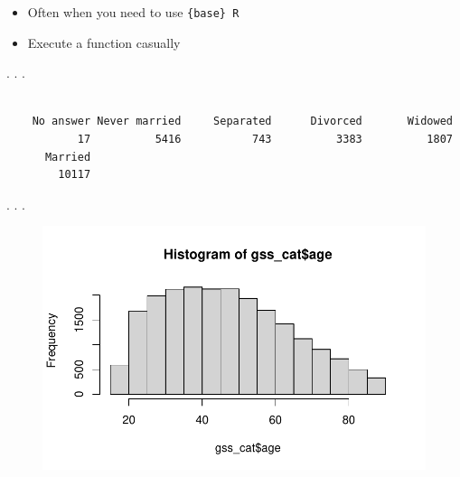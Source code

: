 \documentclass[
  letterpaper,
  DIV=11,
  numbers=noendperiod,
  oneside]{scrartcl}
\newenvironment{Shaded}{\begin{snugshade}}{\end{snugshade}}
\newcommand{\FunctionTok}[1]{\textcolor[rgb]{0.28,0.35,0.67}{#1}}
\newcommand{\NormalTok}[1]{\textcolor[rgb]{0.00,0.23,0.31}{#1}}
\newcommand{\SpecialCharTok}[1]{\textcolor[rgb]{0.37,0.37,0.37}{#1}}
\providecommand{\tightlist}{%
  \setlength{\itemsep}{0pt}\setlength{\parskip}{0pt}}\usepackage{longtable,booktabs,array}
\begin{document}
\begin{itemize}
\tightlist
\item
  Often when you need to use \texttt{\{base\}\ R}
\item
  Execute a function casually
\end{itemize}

. . .

\begin{Shaded}
\end{Shaded}

\begin{verbatim}

    No answer Never married     Separated      Divorced       Widowed 
           17          5416           743          3383          1807 
      Married 
        10117 
\end{verbatim}

. . .

\begin{Shaded}
\end{Shaded}

\begin{figure}[H]

{\centering \includegraphics{w1_intro_files/figure-pdf/unnamed-chunk-30-1.pdf}

}

\end{figure}
\end{document}
